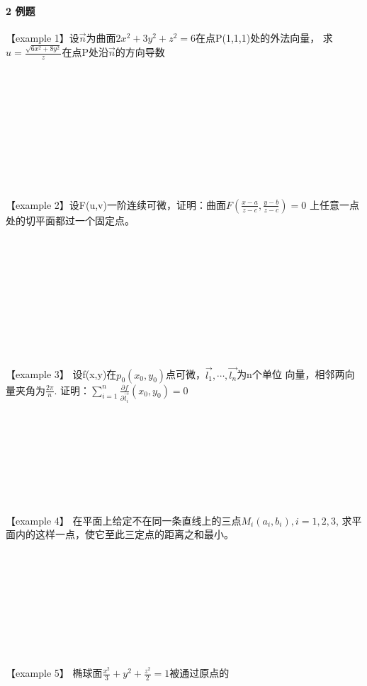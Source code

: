 \documentclass[12pt]{scrartcl}
\begin{document}
{\paragraph*{\large 2 例题}\leavevmode \newline
【example 1】设$\vec{n}$为曲面$2x^2+3y^2+z^2=6$在点P(1,1,1)处的外法向量，
求$u=\frac{\sqrt{6x^2+8y^2}}{z}$在点P处沿$\vec{n}$的方向导数
\\
\\
\\
\\
\\
\\
\\
\\
\\
\\
\\
【example 2】设F(u,v)一阶连续可微，证明：曲面$F(\frac{x-a}{z-c},\frac{y-b}{z-c})=0$
上任意一点处的切平面都过一个固定点。
\\
\\
\\
\\
\\
\\
\\
\\
\\
\\
\\
【example 3】 设f(x,y)在$p_0(x_0,y_0)$点可微，$\vec{l_1},\cdots,\vec{l_n}$为n个单位
向量，相邻两向量夹角为$\frac{2\pi}{n}$.
证明：$\sum_{i = 1}^{n} \frac{\partial f}{\partial \vec{l_i}}(x_0,y_0)=0$ 
\\
\\
\\
\\
\\
\\
\\
\\
\\
【example 4】 在平面上给定不在同一条直线上的三点$M_i(a_i,b_i),i=1,2,3$,
求平面内的这样一点，使它至此三定点的距离之和最小。  \\
\\
\\
\\
\\
\\
\\
\\
\\
\\
【example 5】 椭球面$\frac{x^2}{3}+y^2+\frac{z^2}{2}=1$被通过原点的
}
\end{document}
